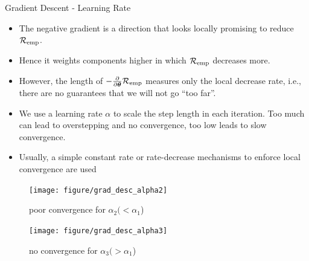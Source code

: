 \documentclass[11pt,compress,t,notes=noshow, xcolor=table]{beamer}
\begin{document}
\begin{vbframe}{Gradient Descent - Learning Rate}
\footnotesize
\begin{itemize}
\item The negative gradient is a direction that looks locally promising to reduce $\mathcal{R}_{\text{emp}}$. \\
\item Hence it weights components higher
    in which $\mathcal{R}_{\text{emp}}$ decreases more. \\
\item However, the length of $-\frac{\partial}{\partial\bm{\theta}}{\mathcal{R}_{\text{emp}}}$ measures only the local decrease rate, i.e., there are no guarantees that we will not go ``too far''. \\
\item We use a learning rate $\alpha$ to scale the step length in each iteration. Too much can lead to overstepping and no convergence, too low leads to slow convergence.
\item Usually, a simple constant rate or rate-decrease mechanisms to enforce local convergence are used
\vspace{-2em}
\end{itemize}
\begin{figure}[!htb]
{
  \texttt{[image: figure/grad\_desc\_alpha2]}
  \caption*{\tiny poor convergence for $\alpha_2 (< \alpha_1$)}
}
{
  \texttt{[image: figure/grad\_desc\_alpha3]}
  \caption*{\tiny no convergence for $\alpha_3 (> \alpha_1$)}
}
\end{figure}

\end{vbframe}
\end{document}
